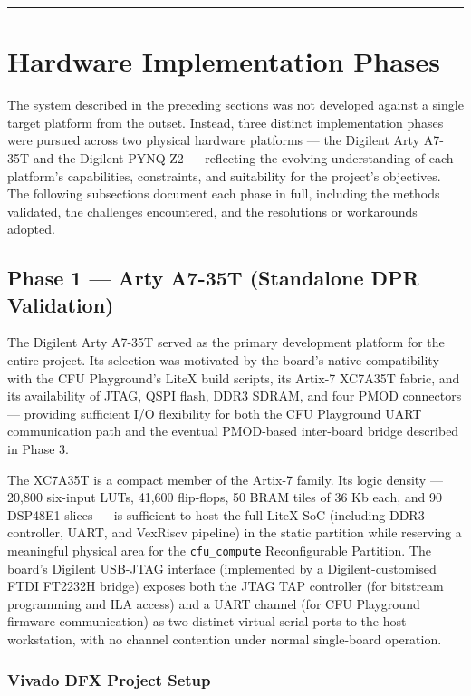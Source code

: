 \vspace{0.4em}\hrule\vspace{0.4em}

\section{Hardware Implementation Phases}

The system described in the preceding sections was not developed against a single target platform from the outset. Instead, three distinct implementation phases were pursued across two physical hardware platforms — the Digilent Arty A7-35T and the Digilent PYNQ-Z2 — reflecting the evolving understanding of each platform's capabilities, constraints, and suitability for the project's objectives. The following subsections document each phase in full, including the methods validated, the challenges encountered, and the resolutions or workarounds adopted.

\subsection{Phase 1 — Arty A7-35T (Standalone DPR Validation)}

The Digilent Arty A7-35T served as the primary development platform for the entire project. Its selection was motivated by the board's native compatibility with the CFU Playground's LiteX build scripts, its Artix-7 XC7A35T fabric, and its availability of JTAG, QSPI flash, DDR3 SDRAM, and four PMOD connectors — providing sufficient I/O flexibility for both the CFU Playground UART communication path and the eventual PMOD-based inter-board bridge described in Phase 3.

The XC7A35T is a compact member of the Artix-7 family. Its logic density — 20,800 six-input LUTs, 41,600 flip-flops, 50 BRAM tiles of 36 Kb each, and 90 DSP48E1 slices — is sufficient to host the full LiteX SoC (including DDR3 controller, UART, and VexRiscv pipeline) in the static partition while reserving a meaningful physical area for the \texttt{cfu\_compute} Reconfigurable Partition. The board's Digilent USB-JTAG interface (implemented by a Digilent-customised FTDI FT2232H bridge) exposes both the JTAG TAP controller (for bitstream programming and ILA access) and a UART channel (for CFU Playground firmware communication) as two distinct virtual serial ports to the host workstation, with no channel contention under normal single-board operation.

\subsubsection{Vivado DFX Project Setup}

